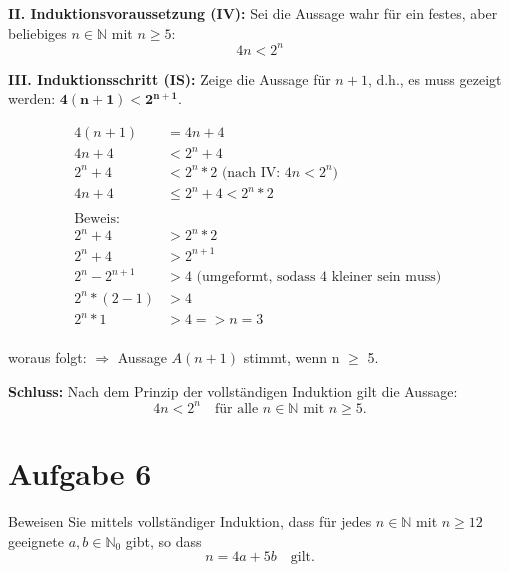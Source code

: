 \documentclass{article}
\begin{document}
\bigskip

\textbf{II. Induktionsvoraussetzung (IV):}
Sei die Aussage wahr für ein festes, aber beliebiges \( n \in \mathbb{N} \) mit $n \geq 5$:
\[
	4n < 2^n
\]

\textbf{III. Induktionsschritt (IS):}
Zeige die Aussage für \( n+1 \), d.h., es muss gezeigt werden: $\mathbf{4(n+1) < 2^{n+1}}$.

\begin{align*}
	4(n+1)      & = 4n + 4                                                          \\
	4n + 4      & < 2^n + 4                                                         \\
	2^n  +4     & <  2^n*2               \text{ (nach IV: } 4n < 2^n)               \\
	4n  +4      & \leq 2^n+4 <  2^n*2                                               \\
	\\
	\text{Beweis: }                                                                 \\
	2^n+4       & > 2^n*2                                                           \\
	2^n+4       & > 2^{n+1}                                                         \\
	2^n-2^{n+1} & > 4              \text{ (umgeformt, sodass 4 kleiner sein muss) } \\
	2^n*(2-1)   & > 4                                                               \\
	2^n*1       & > 4 => n = 3                                                      \\
\end{align*}

woraus folgt:
\(\Rightarrow\) Aussage $A(n+1)$ stimmt, wenn n \(\geq \) 5.

\bigskip

\textbf{Schluss:}
Nach dem Prinzip der vollständigen Induktion gilt die Aussage:
\[
	4n < 2^n \quad \text{für alle } n \in \mathbb{N} \text{ mit } n \geq 5.
\]

\section*{Aufgabe 6}

Beweisen Sie mittels vollständiger Induktion, dass für jedes $n \in \mathbb{N}$ mit $n \geq 12$ geeignete $a, b \in \mathbb{N}_0$ gibt, so dass
\[
	n = 4a + 5b \quad \text{gilt.}
\]
\end{document}
